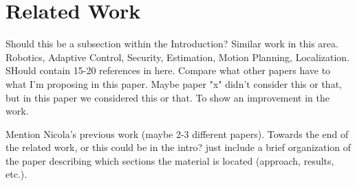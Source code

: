 
\section{Related Work} \label{sec:Related Work}

Should this be a subsection within the Introduction? Similar work in this area. Robotics, Adaptive Control, Security, Estimation, Motion Planning, Localization. SHould contain 15-20 references in here. Compare what other papers have to what I'm proposing in this paper. Maybe paper "x" didn't consider this or that, but in this paper we considered this or that. To show an improvement in the work. 

Mention Nicola's previous work (maybe 2-3 different papers). Towards the end of the related work, or this could be in the intro? just include a brief organization of the paper describing which sections the material is located (approach, results, etc.).